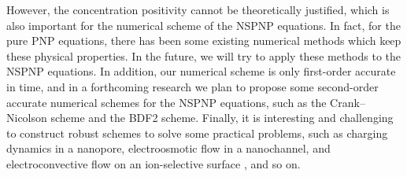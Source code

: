 \documentclass[a4paper,fleqn]{cas-sc}
\numberwithin{equation}{section}
\theoremstyle{definition}
\begin{document}
However, the concentration positivity cannot be theoretically justified, which is also
important for the numerical scheme of the NSPNP equations. In fact, for the pure PNP
equations, there has been some existing numerical methods which keep these physical
properties. In the future, we will try to apply these methods to the NSPNP equations. In
addition, our numerical scheme is only first-order accurate in time, and in a forthcoming
research we plan to propose some second-order accurate numerical schemes for the NSPNP
equations, such as the Crank--Nicolson scheme and the BDF2 scheme. Finally, it is
interesting and challenging to construct robust schemes to solve some practical problems,
such as charging dynamics in a nanopore, electroosmotic flow in a nanochannel, and
electroconvective flow on an ion-selective surface \cite{Wang22017}, and so on.



\nocite{*} %

\end{document}
